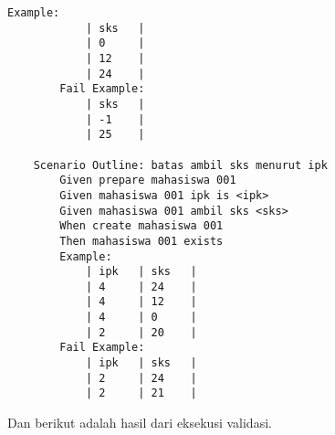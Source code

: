 \begin{lstlisting}[language=gherkin]
        Example:
            | sks   |
            | 0     |
            | 12    |
            | 24    |
        Fail Example:
            | sks   |
            | -1    |
            | 25    |
    
    Scenario Outline: batas ambil sks menurut ipk
        Given prepare mahasiswa 001
        Given mahasiswa 001 ipk is <ipk>
        Given mahasiswa 001 ambil sks <sks>
        When create mahasiswa 001
        Then mahasiswa 001 exists
        Example:
            | ipk   | sks   |
            | 4     | 24    |
            | 4     | 12    |
            | 4     | 0     |
            | 2     | 20    |
        Fail Example:
            | ipk   | sks   |
            | 2     | 24    |
            | 2     | 21    |
\end{lstlisting}

Dan berikut adalah hasil dari eksekusi validasi.

